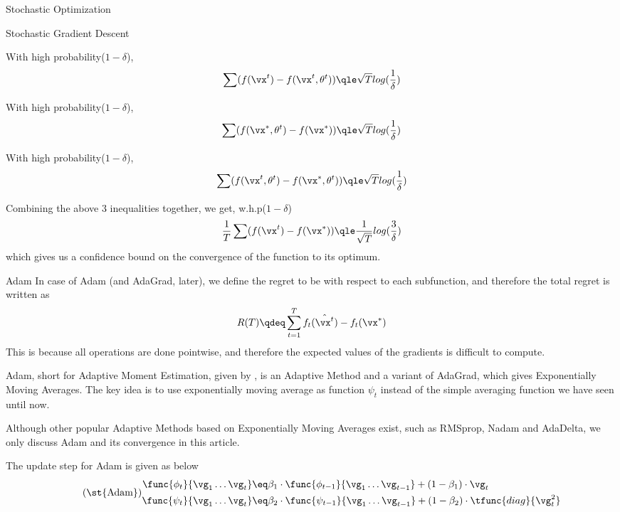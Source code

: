 \documentclass{article}
\begin{document}
\begin{psection}{Stochastic Optimization}
\begin{psubsection}{Stochastic Gradient Descent}
		\begin{claim}
			With high probability($1-\delta$),
			$$
			\sum(f(\vx^t)-f(\vx^t,\theta^t))\qle \sqrt{T}log(\frac{1}{\delta})
			$$
		\end{claim}

		\begin{claim}
			With high probability($1-\delta$),
			$$
			\sum(f(\vx^*,\theta^t)-f(\vx^*))\qle \sqrt{T}log(\frac{1}{\delta})
			$$
		\end{claim}
		\begin{claim}
			With high probability($1-\delta$),
			$$
			\sum(f(\vx^t,\theta^t)-f(\vx^*,\theta^t))\qle \sqrt{T}log(\frac{1}{\delta})
			$$
		\end{claim}
		Combining the above 3 inequalities together, we get, w.h.p($1-\delta$)
		\begin{equation*}
			\begin{aligned}
				\frac{1}{T}\sum(f(\vx^t)-f(\vx^*)) \qle \frac{1}{\sqrt{T}}log(\frac{3}{\delta})
			\end{aligned}
		\end{equation*}
		which gives us a confidence bound on the convergence of the function to its optimum.
	\end{psubsection}

	\begin{psubsection}{Adam}
		In case of Adam (and AdaGrad, later), we define the regret to be with respect to each subfunction, and therefore the total regret is written as
		\begin{equation}
			R(T) \qdeq \sum_{t = 1}^T f_t(\hat{\vx^t}) - f_t(\xs)
			\label{eq:adam-regret}
		\end{equation}
		This is because all operations are done pointwise, and therefore the expected values of the gradients is difficult to compute.

		Adam, short for Adaptive Moment Estimation, given by \cite{adam}, is an Adaptive Method and a variant of AdaGrad, which gives Exponentially Moving Averages. The key idea is to use exponentially moving average as function $\psi_t$ instead of the simple averaging function we have seen until now.

		Although other popular Adaptive Methods based on Exponentially Moving Averages exist, such as RMSprop, Nadam and AdaDelta, we only discuss Adam and its convergence in this article.

		The update step for Adam is given as below
		\begin{equation}
			\tag{\st{Adam}}
			\begin{split}
				\func{\phi_t}{\vg_1 \dots \vg_t} &\eq \beta_1 \cdot \func{\phi_{t - 1}}{\vg_1 \dots \vg_{t - 1}} + (1 - \beta_1) \cdot \vg_t \\
				\func{\psi_t}{\vg_1 \dots \vg_t} &\eq \beta_2 \cdot \func{\psi_{t - 1}}{\vg_1 \dots \vg_{t - 1}} + (1 - \beta_2) \cdot \tfunc{diag}{\vg_t^2}
			\end{split}
			\label{eq:adam}
		\end{equation}


\end{psubsection}
\end{psection}
\end{document}

